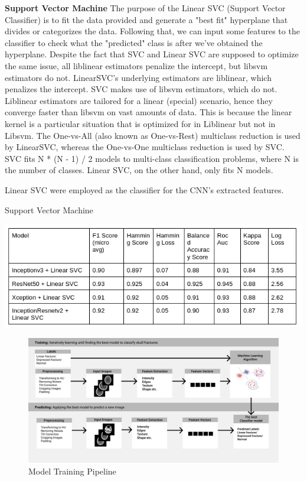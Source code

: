\documentclass[sigconf]{acmart}
\begin{document}
\textbf{Support Vector Machine}
The purpose of the Linear SVC (Support Vector Classifier) is to fit the data provided and generate a "best fit" hyperplane that divides or categorizes the data. Following that, we can input some features to the classifier to check what the "predicted" class is after we've obtained the hyperplane. Despite the fact that SVC and Linear SVC are supposed to optimize the same issue, all liblinear estimators penalize the intercept, but libsvm estimators do not. LinearSVC's underlying estimators are liblinear, which penalizes the intercept. SVC makes use of libsvm estimators, which do not. Liblinear estimators are tailored for a linear (special) scenario, hence they converge faster than libsvm on vast amounts of data. This is because the linear kernel is a particular situation that is optimized for in Liblinear but not in Libsvm. The One-vs-All (also known as One-vs-Rest) multiclass reduction is used by LinearSVC, whereas the One-vs-One multiclass reduction is used by SVC. SVC fits N * (N - 1) / 2 models to multi-class classification problems, where N is the number of classes. Linear SVC, on the other hand, only fits N models.

Linear SVC were employed as the classifier for the CNN’s extracted features.
\begin{table}[h]
  \centering
   \caption{Support Vector Machine}
  \includegraphics[width=\linewidth]{../supplements/svm.png}
 
  \label{Tab.7}
\end{table}
\begin{figure}[h]
  \centering
   
  \includegraphics[width=\linewidth]{../supplements/1234.jpg}
 
  \caption{Model Training Pipeline}
  \label{Tab.6}
\end{figure}
\end{document}
